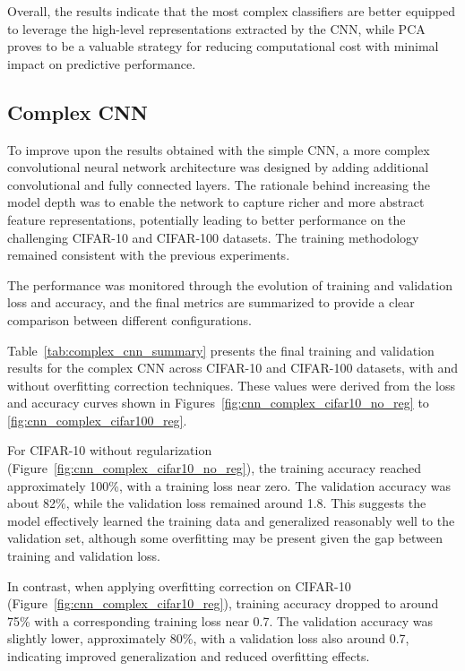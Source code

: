 \documentclass[journal,article,submit,pdftex,moreauthors]{Definitions/mdpi}
\begin{document}
Overall, the results indicate that the most complex classifiers are better equipped to leverage the high-level representations extracted by the CNN, while PCA proves to be a valuable strategy for reducing computational cost with minimal impact on predictive performance.


\subsection{Complex CNN}

To improve upon the results obtained with the simple CNN, a more complex convolutional neural network architecture was designed by adding additional convolutional and fully connected layers. The rationale behind increasing the model depth was to enable the network to capture richer and more abstract feature representations, potentially leading to better performance on the challenging CIFAR-10 and CIFAR-100 datasets.  
The training methodology remained consistent with the previous experiments.

The performance was monitored through the evolution of training and validation loss and accuracy, and the final metrics are summarized to provide a clear comparison between different configurations.

Table~\autoref{tab:complex_cnn_summary} presents the final training and validation results for the complex CNN across CIFAR-10 and CIFAR-100 datasets, with and without overfitting correction techniques. These values were derived from the loss and accuracy curves shown in Figures~\ref{fig:cnn_complex_cifar10_no_reg} to \ref{fig:cnn_complex_cifar100_reg}.

For CIFAR-10 without regularization (Figure~\ref{fig:cnn_complex_cifar10_no_reg}), the training accuracy reached approximately 100\%, with a training loss near zero. The validation accuracy was about 82\%, while the validation loss remained around 1.8. This suggests the model effectively learned the training data and generalized reasonably well to the validation set, although some overfitting may be present given the gap between training and validation loss.

In contrast, when applying overfitting correction on CIFAR-10 (Figure~\ref{fig:cnn_complex_cifar10_reg}), training accuracy dropped to around 75\% with a corresponding training loss near 0.7. The validation accuracy was slightly lower, approximately 80\%, with a validation loss also around 0.7, indicating improved generalization and reduced overfitting effects.
\end{document}
